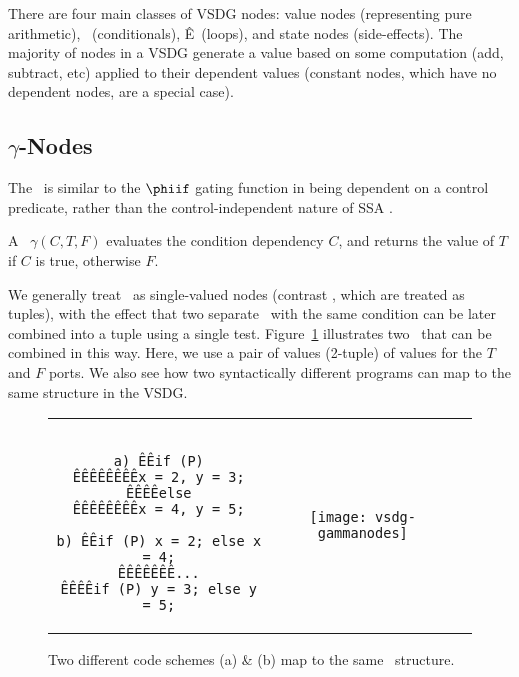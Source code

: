 There are four main classes of VSDG nodes: value nodes (representing pure
arithmetic),
\Gns\ (conditionals), Ê\Tns\ (loops), and state nodes (side-effects). The majority of nodes in a VSDG generate a value based on some computation
(add, subtract, etc) applied to their dependent values (constant nodes,
which have no dependent nodes, are a special case).



\subsection{$\gamma$-Nodes}

The \Gn\ is similar to the $\phiif$ gating function in being dependent on
a control predicate, rather than the control-independent nature of SSA
\phifuns.
%

A \Gn\ $\gamma(C, T, F)$ evaluates the condition dependency $C$, and
returns the value of $T$ if $C$ is true, otherwise $F$.

%
We generally treat \Gns\ as single-valued nodes (contrast \Tns, which are
treated as tuples), with the effect that two separate \Gns\ with the same
condition can be later combined into a tuple
using a single test. 
Figure~\ref{fig:twinPhis} illustrates two \Gns\ that can be combined in
this way. Here, we use a pair of values (2-tuple) of values for the $T$ and $F$ ports. We also see how two syntactically different programs can map to the same structure in the VSDG.

\begin{figure}[!hb]
\centering
\begin{tabular}{ccc}	\cline{1-1}
\begin{minipage}[l]{2.0in}
\begin{verbatim}

a) ÊÊif (P)
ÊÊÊÊÊÊÊÊx = 2, y = 3;
ÊÊÊÊelse
ÊÊÊÊÊÊÊÊx = 4, y = 5;

b) ÊÊif (P) x = 2; else x = 4;
ÊÊÊÊÊÊÊ...
ÊÊÊÊif (P) y = 3; else y = 5;

\end{verbatim}
\end{minipage}	
& \hspace {0.2in}
\begin{minipage}[m][\height][l]{1.6in}
\texttt{[image: vsdg-gammanodes]}
\end{minipage} \\ \cline{1-1}
\end{tabular}

\caption{Two different code schemes (a) \& (b) map to the same
\Gn\ structure.}

\label{fig:twinPhis}
\end{figure}


